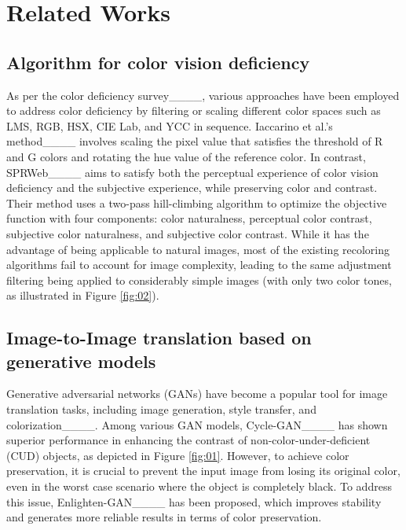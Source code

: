 \section{Related Works}
\subsection{Algorithm for color vision deficiency}
As per the color deficiency survey____, various approaches have been employed to address color deficiency by filtering or scaling different color spaces such as LMS, RGB, HSX, CIE Lab, and YCC in sequence. Iaccarino et al.'s method____ involves scaling the pixel value that satisfies the threshold of R and G colors and rotating the hue value of the reference color. In contrast, SPRWeb____ aims to satisfy both the perceptual experience of color vision deficiency and the subjective experience, while preserving color and contrast. Their method uses a two-pass hill-climbing algorithm to optimize the objective function with four components: color naturalness, perceptual color contrast, subjective color naturalness, and subjective color contrast. While it has the advantage of being applicable to natural images, most of the existing recoloring algorithms fail to account for image complexity, leading to the same adjustment filtering being applied to considerably simple images (with only two color tones, as illustrated in Figure \ref{fig:02}).


\subsection{Image-to-Image translation based on generative models}
Generative adversarial networks (GANs) have become a popular tool for image translation tasks, including image generation, style transfer, and colorization____. Among various GAN models, Cycle-GAN____ has shown superior performance in enhancing the contrast of non-color-under-deficient (CUD) objects, as depicted in Figure \ref{fig:01}. However, to achieve color preservation, it is crucial to prevent the input image from losing its original color, even in the worst case scenario where the object is completely black. To address this issue, Enlighten-GAN____ has been proposed, which improves stability and generates more reliable results in terms of color preservation. 

